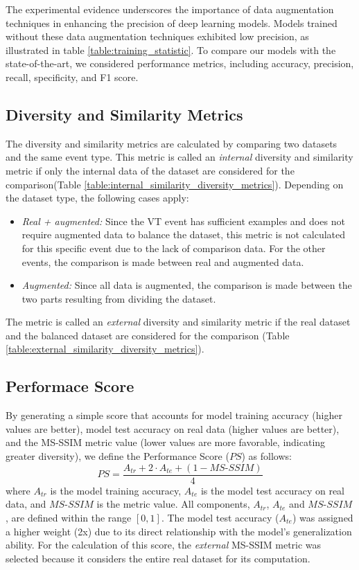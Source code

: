 \documentclass[journal]{IEEEtran}
\begin{document}
The experimental evidence underscores the importance of data augmentation techniques in enhancing the precision of deep learning models. Models trained without these data augmentation techniques exhibited low precision, as illustrated in table \ref{table:training_statistic}.
To compare our models with the state-of-the-art, we considered performance metrics, including accuracy, precision, recall, specificity, and F1 score.\\

\subsection{Diversity and Similarity Metrics}
The diversity and similarity metrics are calculated by comparing two datasets and the same event type. This metric is called an \textit{internal} diversity and similarity metric if only the internal data of the dataset are considered for the comparison(Table \ref{table:internal_similarity_diversity_metrics}). Depending on the dataset type, the following cases apply:
\begin{itemize}
\item \textit{Real + augmented:} Since the VT event has sufficient examples and does not require augmented data to balance the dataset, this metric is not calculated for this specific event due to the lack of comparison data. For the other events, the comparison is made between real and augmented data.
\item \textit{Augmented:} Since all data is augmented, the comparison is made between the two parts resulting from dividing the dataset.
\end{itemize}
The metric is called an \textit{external} diversity and similarity metric if the real dataset and the balanced dataset are considered for the comparison (Table \ref{table:external_similarity_diversity_metrics}).

\subsection{Performace Score}
By generating a simple score that accounts for model training accuracy (higher values are better), model test accuracy on real data (higher values are better), and the MS-SSIM metric value (lower values are more favorable, indicating greater diversity), we define the Performance Score ($PS$) as follows:
\begin{equation}
PS = \frac{A_{tr}+2\cdot A_{te}+(1 - MS\text{-}SSIM)}{4}
\end{equation}
where $A_{tr}$ is the model training accuracy, $A_{te}$ is the model test accuracy on real data, and $MS\text{-}SSIM$ is the metric value. All components, $A_{tr}$, $A_{te}$ and $MS\text{-}SSIM$, are defined within the range $\left[0, 1\right]$. The model test accuracy ($A_{te}$) was assigned a higher weight (2x) due to its direct relationship with the model's generalization ability. For the calculation of this score, the \textit{external} MS-SSIM metric was selected because it considers the entire real dataset for its computation.
\end{document}
